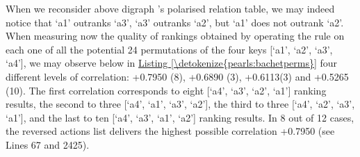 \documentclass[a4paper,12pt,english]{sphinxhowto}
\begin{document}
\sphinxAtStartPar
When we reconsider above digraph ’s polarised relation table, we may indeed notice that ‘a1’ outranks ‘a3’, ‘a3’ outranks ‘a2’, but ‘a1’ does not outrank ‘a2’. When measuring now the quality of  rankings obtained by operating the  rule on each one of all the potential 24 permutations of the four  keys {[}‘a1’, ‘a2’, ‘a3’, ‘a4’{]}, we may observe below in \hyperref[\detokenize{pearls:bachetperms}]{Listing \ref{\detokenize{pearls:bachetperms}}} four different levels of correlation: +0.7950 (8), +0.6890 (3), +0.6113(3) and +0.5265 (10). The first correlation corresponds to eight {[}‘a4’, ‘a3’, ‘a2’, ‘a1’{]} ranking results, the second to three {[}‘a4’, ‘a1’, ‘a3’, ‘a2’{]}, the third to three {[}‘a4’, ‘a2’, ‘a3’, ‘a1’{]}, and the last to ten {[}‘a4’, ‘a3’, ‘a1’, ‘a2’{]} ranking results. In 8 out of 12 cases, the reversed actions list delivers the highest possible correlation +0.7950 (see Lines 6\sphinxhyphen{}7 and 24\sphinxhyphen{}25).
\def\sphinxLiteralBlockLabel{\label{\detokenize{pearls:bachetperms}}}
%
\end{document}
